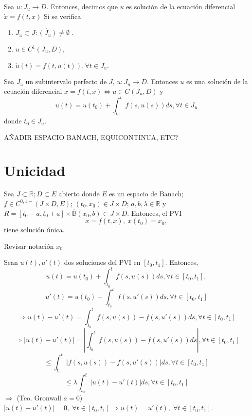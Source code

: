 \begin{defn}
  Sea $u: J_{u} \to D$. Entonces, decimos que $u$ es solución de la ecuación diferencial $\dot{x} = f(t,x)$ Si se verifica
  \begin{enumerate}[label=(\roman*)]
    \item $J_{u} \subset J : \mathring{(J_{u})} \neq \emptyset$ .
    \item $u \in C^{1}(J_{u}, D)$,
    \item $\dot{u}(t) = f(t, u(t)), \forall t \in J_{u}$.
  \end{enumerate}
\end{defn}

\begin{lem}
  Sea $J_{u}$ un subintervalo perfecto de $J$, $u: J_{u} \to D$. Entonces $u$ es una solución de la ecuación diferencial $\dot{x} = f(t,x) \Leftrightarrow u \in C^{}(J_{u}, D)$ y
      \[ 
        u(t) = u(t_{0}) + \int_{t_{0}}^{t} f(s, u(s)) ds, \forall t \in J_{u} 
      \] 
      donde $t_{0} \in J_{u}$.
\end{lem}

AÑADIR ESPACIO BANACH, 
EQUICONTINUA, ETC?

\section{Unicidad}

\begin{theo}[de Unicidad]
  Sea $J \subset \mathbb{R}; D \subset E$ abierto donde $E$ es un espacio de Banach; $f \in C^{0,1-}(J \times D, E)$; $(t_{0}, x_{0}) \in J \times D$; $ a, b, \lambda \in \mathbb{R}$ y $R = [t_{0} - a, t_{0} + a] \times \overline{\mathbb{B}}(x_{0}, b) \subset J \times D$. Entonces, el PVI
  \[ 
    \dot{x} = f(t, x), \; x(t_{0}) = x_{0},
  \] 
  tiene solución única.
\end{theo}

Revisar notación $x_{0}$

\begin{dem}
  Sean $u(t), u'(t)$ dos soluciones del PVI en $[t_{0}, t_{1}]$. Entonces,
  \[ 
    u(t) = u(t_{0}) + \int_{t_{0}}^{t} f(s, u(s)) ds, \forall t \in [t_{0}, t_{1}],
  \] 
  \[ 
    u'(t) = u(t_{0}) + \int_{t_{0}}^{t} f(s, u'(s)) ds, \forall t \in [t_{0}, t_{1}]
  \] 
  \[ 
    \Rightarrow u(t) - u'(t) = \int_{t_{0}}^{t} f(s, u(s)) - f(s, u'(s)) ds, \forall t \in [t_{0}, t_{1}]
  \] 
  \[ 
    \Rightarrow | u(t) - u'(t) | = | \int_{t_{0}}^{t} f(s, u(s)) - f(s, u'(s)) ds |, \forall t \in [t_{0}, t_{1}]
 
  \] 
  \[ 
    \leq \int_{t_{0}}^{t} | f(s, u(s)) - f(s, u'(s)) | ds, \forall t \in [t_{0}, t_{1}]
  \] 
  \[ 
    \leq  \lambda \int_{t_{0}}^{t} | u(t) - u'(t) | ds, \forall t \in [t_{0}, t_{1}]
  \] 
  $\Rightarrow $ (Teo. Gronwall $a = 0$) $ | u(t) - u'(t) | = 0, \; \forall t \in [t_{0}, t_{1}] \Rightarrow u(t) = u'(t), \; \forall t \in [t_{0}, t_{1}]$.
\end{dem}


